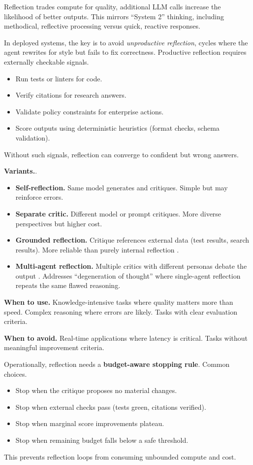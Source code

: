 Reflection trades compute for quality, additional LLM calls increase the likelihood of better outputs. This mirrors ``System 2'' thinking, including methodical, reflective processing versus quick, reactive responses.

In deployed systems, the key is to avoid \textit{unproductive reflection}, cycles where the agent rewrites for style but fails to fix correctness. Productive reflection requires externally checkable signals.
\begin{itemize}
\item Run tests or linters for code.
\item Verify citations for research answers.
\item Validate policy constraints for enterprise actions.
\item Score outputs using deterministic heuristics (format checks, schema validation).
\end{itemize}
Without such signals, reflection can converge to confident but wrong answers.

\textbf{Variants.}.
\begin{itemize}
\item \textbf{Self-reflection.} Same model generates and critiques. Simple but may reinforce errors.
\item \textbf{Separate critic.} Different model or prompt critiques. More diverse perspectives but higher cost.
\item \textbf{Grounded reflection.} Critique references external data (test results, search results). More reliable than purely internal reflection \cite{reflexion2023}.
\item \textbf{Multi-agent reflection.} Multiple critics with different personas debate the output \cite{mar2025}. Addresses ``degeneration of thought'' where single-agent reflection repeats the same flawed reasoning.
\end{itemize}

\textbf{When to use.} Knowledge-intensive tasks where quality matters more than speed. Complex reasoning where errors are likely. Tasks with clear evaluation criteria.

\textbf{When to avoid.} Real-time applications where latency is critical. Tasks without meaningful improvement criteria.

Operationally, reflection needs a \textbf{budget-aware stopping rule}. Common choices.
\begin{itemize}
\item Stop when the critique proposes no material changes.
\item Stop when external checks pass (tests green, citations verified).
\item Stop when marginal score improvements plateau.
\item Stop when remaining budget falls below a safe threshold.
\end{itemize}
This prevents reflection loops from consuming unbounded compute and cost.

